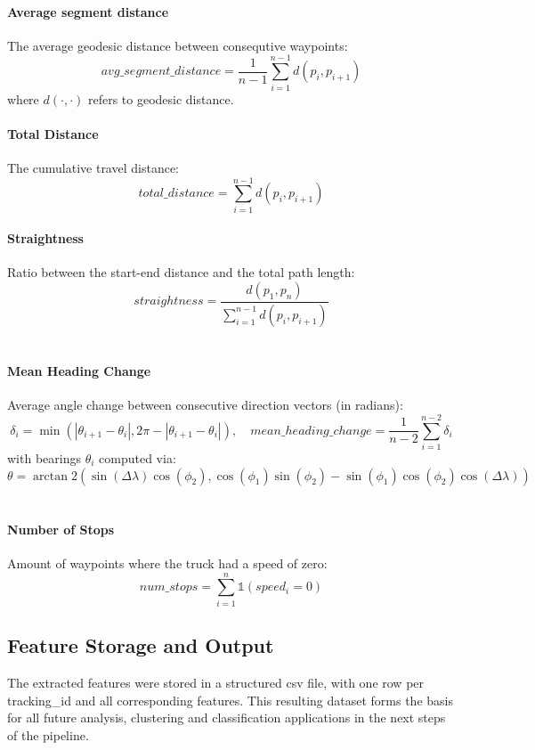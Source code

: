 \documentclass[a4paper,12pt,twoside]{scrreprt}
\begin{document}
\paragraph{Average segment distance}

The average geodesic distance between consequtive waypoints:
\[
  avg\_segment\_distance = \frac{1}{n-1} \sum_{i=1}^{n-1} d(p_i, p_{i+1})
\]
where $d(\cdot, \cdot)$ refers to geodesic distance.

\paragraph{Total Distance}
The cumulative travel distance:
\[
  total\_distance = \sum_{i=1}^{n-1} d(p_i, p_{i+1})
\]

\paragraph{Straightness}
Ratio between the start-end distance and the total path length:
\[
  straightness = \frac{d(p_1, p_n)}{\sum_{i=1}^{n-1} d(p_i, p_{i+1})}
\]
~\cite{benhamou_how_2004}

\paragraph{Mean Heading Change}
Average angle change between consecutive direction vectors (in radians):
\[
  \delta_i = \min(|\theta_{i+1} - \theta_i|, 2\pi - |\theta_{i+1} - \theta_i|),
  \quad
  mean\_heading\_change = \frac{1}{n-2} \sum_{i=1}^{n-2} \delta_i
\]
with bearings $\theta_i$ computed via:
\[
  \theta = \arctan2\left( \sin(\Delta \lambda) \cos(\phi_2),
  \cos(\phi_1)\sin(\phi_2) - \sin(\phi_1)\cos(\phi_2)\cos(\Delta \lambda)
  \right)
\]
~\cite{etemad_predicting_2018}

\paragraph{Number of Stops}
Amount of waypoints where the truck had a speed of zero:
\[
  num\_stops = \sum_{i=1}^{n} \mathbb{1}(speed_i = 0)
\]

\subsection{Feature Storage and Output}

The extracted features were stored in a structured csv file, with one row per
tracking\_id and all corresponding features. This resulting dataset forms the
basis for all future analysis, clustering and classification applications in
the next steps of the pipeline.
\end{document}
